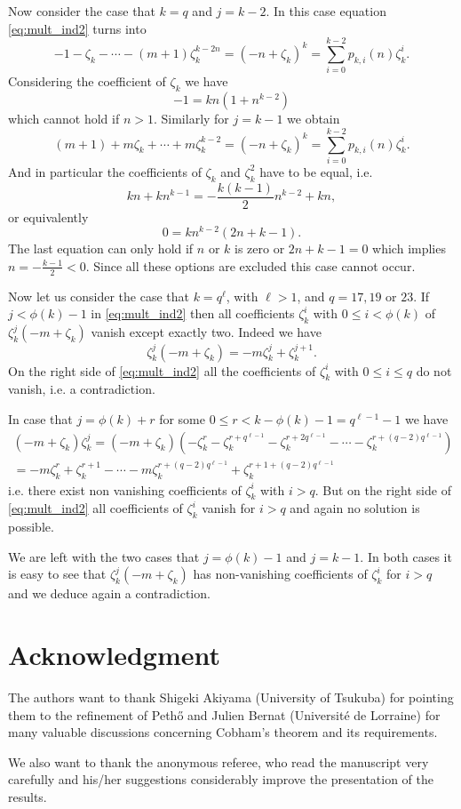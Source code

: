 \documentclass{amsart}
\theoremstyle{plain}
\numberwithin{equation}{section}
\theoremstyle{remark}
\begin{document}
Now consider the case that $k=q$ and $j=k-2$. In this case equation \eqref{eq:mult_ind2} turns into
\[-1-\zeta_k-\cdots-(m+1)\zeta_k^{k-2n}=(-n+\zeta_k)^k=\sum_{i=0}^{k-2} p_{k,i}(n)\zeta_k^i.\]
Considering the coefficient of $\zeta_k$ we have
\[-1=kn(1+n^{k-2})\]
which cannot hold if $n>1$.
Similarly for $j=k-1$ we obtain
\[(m+1)+m\zeta_k+\cdots+m\zeta_k^{k-2}=(-n+\zeta_k)^k=\sum_{i=0}^{k-2} p_{k,i}(n)\zeta_k^i.\]
And in particular the coefficients of $\zeta_k$ and $\zeta_k^2$ have to be equal, i.e.
\[kn+kn^{k-1}=-\frac{k(k-1)}2 n^{k-2}+kn,\]
or equivalently
\[0=kn^{k-2}(2n+k-1).\] The last equation can only hold if $n$ or $k$
is zero or $2n+k-1=0$ which implies $n=-\frac{k-1}2<0$. Since all these
options are excluded this case cannot occur.

Now let us consider the case that $k=q^\ell$, with $\ell>1$, and $q=17,19$ or $23$. If $j<\phi(k)-1$ in \eqref{eq:mult_ind2} then all coefficients $\zeta_k^i$ 
with $0\leq i <\phi(k)$ of $\zeta_k^j(-m+\zeta_k)$ vanish except exactly two. Indeed we have
\[\zeta_k^j(-m+\zeta_k)=-m\zeta_k^j+\zeta_k^{j+1}.\]
On the right side of \eqref{eq:mult_ind2} all the coefficients of $\zeta_k^i$ with $0\leq i \leq q$ do not vanish, i.e. a contradiction.

In case that $j=\phi(k)+r$ for some $0\leq r < k-\phi(k)-1=q^{\ell -1}-1$ we have
\begin{multline*}
(-m+\zeta_k)\zeta_k^j=(-m+\zeta_k)\left(-\zeta_k^r-\zeta_k^{r+q^{\ell-1}}-\zeta_k^{r+2q^{\ell-1}}-\cdots-\zeta_k^{r+(q-2)q^{\ell-1}}\right)\\
=-m\zeta_k^r +\zeta_k^{r+1}-\cdots -m\zeta_k^{r+(q-2)q^{\ell-1}}+\zeta_k^{r+1+(q-2)q^{\ell-1}}
\end{multline*}
i.e. there exist non vanishing coefficients of $\zeta_k^i$ with $i>q$. But on the right side of \eqref{eq:mult_ind2} all coefficients of $\zeta_k^i$ 
vanish for $i>q$ and again no solution is possible.

We are left with the two cases that $j=\phi(k)-1$ and $j=k-1$. In both cases it is easy to see that $\zeta_k^j(-m+\zeta_k)$ has non-vanishing coefficients of 
$\zeta_k^i$ for $i>q$ and we deduce again a contradiction.

\section*{Acknowledgment}

The authors want to thank Shigeki Akiyama (University of Tsukuba) for
pointing them to the refinement of Peth{\H o} \cite[Theorem
7.1]{pethoe1991:polynomial_transformation_and} and Julien Bernat
(Universit\'e de Lorraine) for many valuable discussions concerning
Cobham's theorem and its requirements.

We also want to thank the anonymous referee, who read the manuscript
very carefully and his/her suggestions considerably improve the
presentation of the results.



\end{document}

